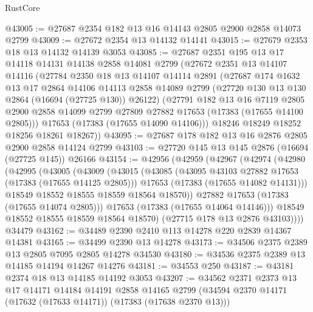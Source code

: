 \begin{lexlean}{RustCore}
\begin{coremodule}
@43005 := @27687 @2354 @182 @13 @16 @14143 @2805 @2900 @2858 @14073 @2799
@43009 := @27672 @2354 @13 @14132 @14141
@43015 := @27679 @2353 @18 @13 @14132 @14139 @3053
@43085 := @27687
    @2351
    @195
    @13
    @17
    @14118
    @14131
    @14138
    @2858
    @14081
    @2799
    (@27672
      @2351
      @13
      @14107
      @14116
      (@27784
        @2350
        @18
        @13
        @14107
        @14114
        @2891
        (@27687
          @174
          @1632
          @13
          @17
          @2864
          @14106
          @14113
          @2858
          @14089
          @2799
          (@27720 @130 @13 @130 @2864 (@16694 (@27725 @130)) @26122)
          (@27791
            @182
            @13
            @16
            @7119
            @2805
            @2900
            @2858
            @14099
            @2799
            @27809
            @27882
            @17653
            (@17383 (@17655 @14100 @2805)))
          @17653
          (@17383 (@17655 @14090 @14106)))
        @18246
        @18249
        @18252
        @18256
        @18261
        @18267))
@43095 := @27687 @178 @182 @13 @16 @2876 @2805 @2900 @2858 @14124 @2799
@43103 := @27720 @145 @13 @145 @2876 (@16694 (@27725 @145)) @26166
@43154 := @42956
    (@42959
      (@42967
        (@42974
          (@42980
            (@42995
              (@43005
                (@43009
                  (@43015
                    (@43085
                      (@43095 @43103 @27882 @17653 (@17383 (@17655 @14125 @2805)))
                      @17653
                      (@17383 (@17655 @14082 @14131)))
                    @18549
                    @18552
                    @18555
                    @18559
                    @18564
                    @18570))
                @27882
                @17653
                (@17383 (@17655 @14074 @2805)))
              @17653
              (@17383 (@17655 @14064 @14146)))
            @18549
            @18552
            @18555
            @18559
            @18564
            @18570)
          (@27715 @178 @13 @2876 @43103))))
    @34479
@43162 := @34489 @2390 @2410 @113 @14278 @220 @2839 @14367 @14381
@43165 := @34499 @2390 @13 @14278
@43173 := @34506 @2375 @2389 @13 @2805 @7095 @2805 @14278 @34530
@43180 := @34536 @2375 @2389 @13 @14185 @14194 @14267 @14276
@43181 := @34553 @250
@43187 := @43181 @2374 @18 @13 @14185 @14192 @3053
@43207 := @34562
    @2371
    @2373
    @13
    @17
    @14171
    @14184
    @14191
    @2858
    @14165
    @2799
    (@34594 @2370 @14171 (@17632 (@17633 @14171)) (@17383 (@17638 @2370 @13)))

\end{coremodule}
\end{lexlean}
